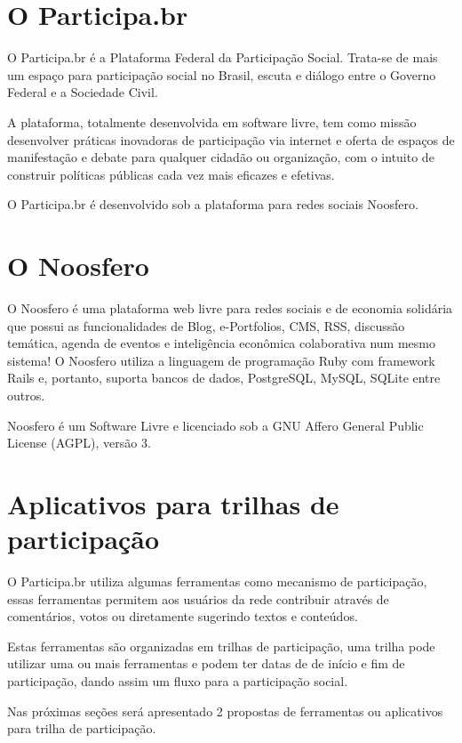 \documentclass[12pt]{article}
\begin{document}
\section{O Participa.br}

O Participa.br é a Plataforma Federal da Participação Social. Trata-se de mais
um espaço para participação social no Brasil, escuta e diálogo entre o Governo
Federal e a Sociedade Civil. 

A plataforma, totalmente desenvolvida em software livre, tem como missão
desenvolver práticas inovadoras de participação via internet e oferta de
espaços de manifestação e debate para qualquer cidadão ou organização, com o
intuito de construir políticas públicas cada vez mais eficazes e efetivas.

O Participa.br é desenvolvido sob a plataforma para redes sociais Noosfero.

\section{O Noosfero}

O Noosfero é uma plataforma web livre para redes sociais e de economia
solidária que possui as funcionalidades de Blog, e-Portfolios, CMS, RSS,
discussão temática, agenda de eventos e inteligência econômica colaborativa
num mesmo sistema! O Noosfero utiliza a linguagem de programação Ruby com
framework Rails e, portanto, suporta bancos de dados, PostgreSQL, MySQL,
SQLite entre outros.

Noosfero é um Software Livre e licenciado sob a GNU Affero General Public
License (AGPL), versão 3. 

\section{Aplicativos para trilhas de participação}

O Participa.br utiliza algumas ferramentas como mecanismo de participação,
essas ferramentas permitem aos usuários da rede contribuir através de
comentários, votos ou diretamente sugerindo textos e conteúdos.

Estas ferramentas são organizadas em trilhas de participação, uma trilha
pode utilizar uma ou mais ferramentas e podem ter datas de de início e fim de
participação, dando assim um fluxo para a participação social.

Nas próximas seções será apresentado 2 propostas de ferramentas ou aplicativos
para trilha de participação.
\end{document}
